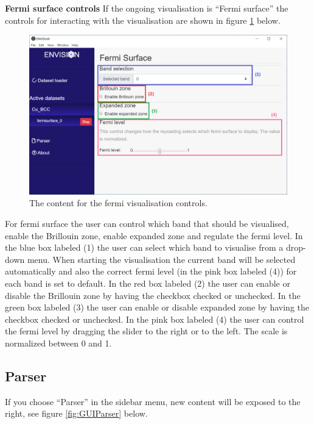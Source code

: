 \textbf{Fermi surface controls}
\newline
If the ongoing visualisation is ``Fermi surface'' the controls for interacting with the visualisation are shown in figure \ref{fig:GUIFermi} below.

\begin{figure}[H]
    \centering
    \includegraphics[scale = 0.45]{images/GUI_Fermicontent.png}
    \caption{The content for the fermi visualisation controls.}
    \label{fig:GUIFermi}
\end{figure}

For fermi surface the user can control which band that should be visualised, enable the Brillouin zone, enable expanded zone and regulate the fermi level. In the blue box labeled (1) the user can select which band to visualise from a drop-down menu. When starting the visualisation the current band will be selected automatically and also the correct fermi level (in the pink box labeled (4)) for each band is set to default. In the red box labeled (2) the user can enable or disable the Brillouin zone by having the checkbox checked or unchecked. In the green box labeled (3) the user can enable or disable expanded zone by having the checkbox checked or unchecked. In the pink box labeled (4) the user can control the fermi level by dragging the slider to the right or to the left. The scale is normalized between 0 and 1.

\subsection{Parser}
If you choose ``Parser'' in the sidebar menu, new content will be exposed to the right, see figure \ref{fig:GUIParser} below. 

